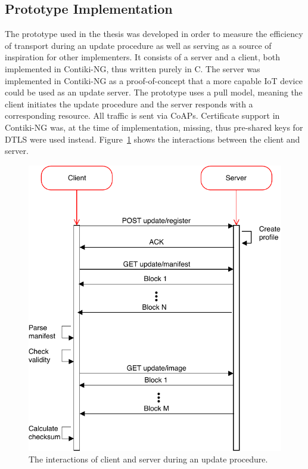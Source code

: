 \documentclass[0-thesis.tex]{subfiles}
\begin{document}
\subsection{Prototype Implementation}
\label{ssec:prototype-implementation}
The prototype used in the thesis was developed in order to measure the efficiency of
transport during an update procedure as well as serving as a source of inspiration for
other implementers. It consists of a server and a client, both implemented in Contiki-NG,
thus written purely in C. The server was implemented in Contiki-NG as a proof-of-concept
that a more capable IoT device could be used as an update server. The prototype uses a
pull model, meaning the client initiates the update procedure and the server responds with
a corresponding resource. All traffic is sent via CoAPs. Certificate support in Contiki-NG
was, at the time of implementation, missing, thus pre-shared keys for DTLS were used
instead. Figure~\ref{fig:client-server-interaction} shows the interactions between the
client and server.

\begin{figure}[h!]
    \caption{The interactions of client and server during an update procedure.}
    \label{fig:client-server-interaction}
    \includegraphics{images/client-server-sequence.pdf}
\end{figure}
\end{document}
